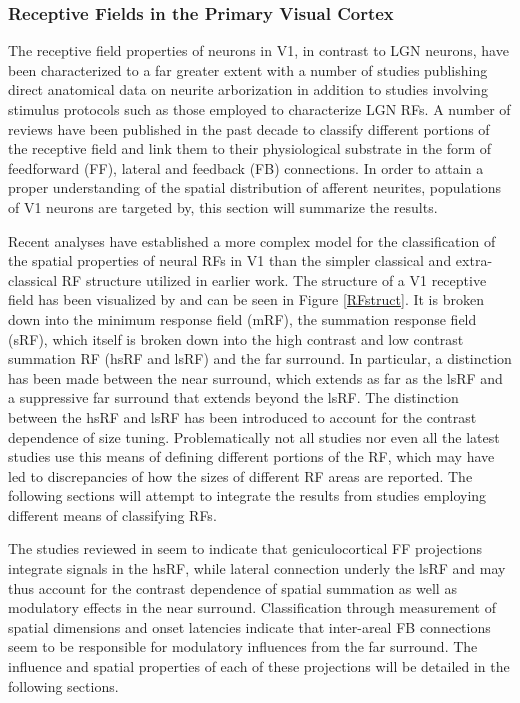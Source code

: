 \subsubsection{Receptive Fields in the Primary Visual Cortex}


The receptive field properties of neurons in V1, in contrast to LGN
neurons, have been characterized to a far greater extent with a number
of studies publishing direct anatomical data on neurite arborization
in addition to studies involving stimulus protocols such as those
employed to characterize LGN RFs. A number of reviews have been
published in the past decade to classify different portions of the
receptive field and link them to their physiological substrate in the
form of feedforward (FF), lateral and feedback (FB) connections. In
order to attain a proper understanding of the spatial distribution of
afferent neurites, populations of V1 neurons are targeted by, this
section will summarize the results.

Recent analyses have established a more complex model for the
classification of the spatial properties of neural RFs in V1 than the
simpler classical and extra-classical RF structure utilized in earlier
work. The structure of a V1 receptive field has been visualized by
\cite{Angelucci2006a} and can be seen in Figure \ref{RFstruct}. It is
broken down into the minimum response field (mRF), the summation
response field (sRF), which itself is broken down into the high
contrast and low contrast summation RF (hsRF and lsRF) and the far
surround. In particular, a distinction has been made between the near
surround, which extends as far as the lsRF and a suppressive far
surround that extends beyond the lsRF. The distinction between the
hsRF and lsRF has been introduced to account for the contrast
dependence of size tuning. Problematically not all studies nor even
all the latest studies use this means of defining different portions
of the RF, which may have led to discrepancies of how the sizes of
different RF areas are reported. The following sections will attempt
to integrate the results from studies employing different means of
classifying RFs.

The studies reviewed in \cite{Angelucci2006a} seem to indicate that
geniculocortical FF projections integrate signals in the hsRF, while
lateral connection underly the lsRF and may thus account for the
contrast dependence of spatial summation as well as modulatory effects
in the near surround. Classification through measurement of spatial
dimensions and onset latencies indicate that inter-areal FB
connections seem to be responsible for modulatory influences from the
far surround. The influence and spatial properties of each of these
projections will be detailed in the following sections.

